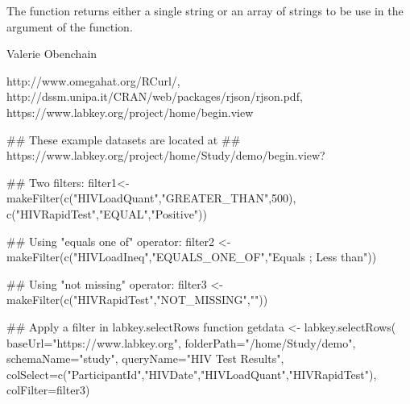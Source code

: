\documentclass{book}
\begin{document}
\begin{Value}
The function returns either a single string or an array of strings to be use in the
 argument of the  function.
\end{Value}
\begin{Author}\relax
Valerie Obenchain
\end{Author}
\begin{References}\relax
http://www.omegahat.org/RCurl/, \\
http://dssm.unipa.it/CRAN/web/packages/rjson/rjson.pdf,\\
https://www.labkey.org/project/home/begin.view
\end{References}
\begin{SeeAlso}\relax
{}
\end{SeeAlso}
\begin{Examples}
\begin{ExampleCode}
## These example datasets are located at 
## https://www.labkey.org/project/home/Study/demo/begin.view?

## Two filters:
filter1<- makeFilter(c("HIVLoadQuant","GREATER_THAN",500), 
c("HIVRapidTest","EQUAL","Positive"))

## Using "equals one of" operator:
filter2 <- makeFilter(c("HIVLoadIneq","EQUALS_ONE_OF","Equals ; Less than"))

## Using "not missing" operator:
filter3 <- makeFilter(c("HIVRapidTest","NOT_MISSING","")) 

## Apply a filter in labkey.selectRows function
getdata <- labkey.selectRows(
baseUrl="https://www.labkey.org", 
folderPath="/home/Study/demo", 
schemaName="study", 
queryName="HIV Test Results", 
colSelect=c("ParticipantId","HIVDate","HIVLoadQuant","HIVRapidTest"), 
colFilter=filter3)


\end{ExampleCode}
\end{Examples}
\end{document}
